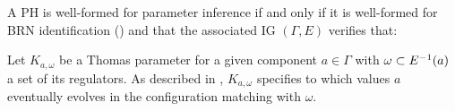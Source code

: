 \begin{property}\label{pro:wf-ph-K}
A PH is well-formed for parameter inference if and only if
it is well-formed for BRN identification () and
that the associated IG $(\Gamma, E)$ verifies that:
\end{property}

Let $K_{a,\omega}$ be a Thomas parameter for a given component $a \in \Gamma$ 
with $\omega \subset E^{-1}(a)$ a set of its regulators.
As described in , $K_{a,\omega}$ specifies to which values $a$ eventually evolves
in the configuration matching with $\omega$.

